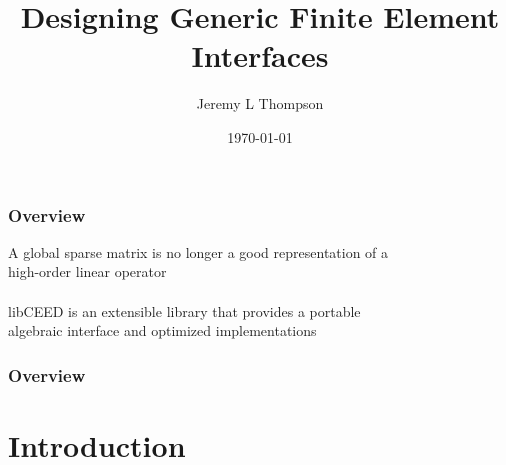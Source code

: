 \documentclass{beamer}
\title[Generic Finite Element Interfaces]{Designing Generic Finite Element Interfaces} %
\author{Jeremy L Thompson} %
\institute[CU Boulder] %
{University of Colorado Boulder \\ %
\medskip
\textit{jeremy.thompson@colorado.edu} %
}
\date{\today} %
\begin{document}
\begin{frame}
\titlepage %
\end{frame}


\begin{frame}
\begin{center}
\frametitle{Overview}

A global sparse matrix is no longer a good representation of a\\high-order linear operator\\

~\\

libCEED is an extensible library that provides a portable\\algebraic interface and optimized implementations

\end{center}
\end{frame}
 

\begin{frame}
\frametitle{Overview} %
\tableofcontents %
\end{frame}


\section{Introduction}

\end{document}
